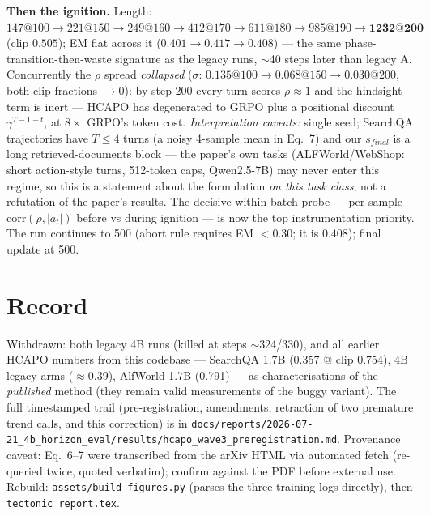 \documentclass[11pt]{article}
\begin{document}
\textbf{Then the ignition.} Length: $147@100 \to 221@150 \to 249@160 \to 412@170 \to 611@180
\to 985@190 \to \mathbf{1232@200}$ (clip $0.505$); EM flat across it ($0.401\to0.417\to0.408$) ---
the same phase-transition-then-waste signature as the legacy runs, $\sim$40 steps later than legacy
A. Concurrently the $\rho$ spread \emph{collapsed} ($\sigma$: $0.135@100 \to 0.068@150 \to
0.030@200$, both clip fractions $\to0$): by step 200 every turn scores $\rho\approx1$ and the
hindsight term is inert --- HCAPO has degenerated to GRPO plus a positional discount
$\gamma^{T-1-t}$, at $8\times$ GRPO's token cost. \emph{Interpretation caveats:} single seed;
SearchQA trajectories have $T\le4$ turns (a noisy 4-sample mean in Eq.~7) and our $s_{final}$ is a
long retrieved-documents block --- the paper's own tasks (ALFWorld/WebShop: short action-style
turns, 512-token caps, Qwen2.5-7B) may never enter this regime, so this is a statement about the
formulation \emph{on this task class}, not a refutation of the paper's results. The decisive
within-batch probe --- per-sample $\mathrm{corr}(\rho, |a_t|)$ before vs during ignition --- is now
the top instrumentation priority. The run continues to 500 (abort rule requires EM $<0.30$; it is
$0.408$); final update at 500.

\section{Record}
Withdrawn: both legacy 4B runs (killed at steps $\sim$324/330), and all earlier HCAPO numbers from
this codebase --- SearchQA 1.7B (0.357 @ clip 0.754), 4B legacy arms ($\approx$0.39), AlfWorld 1.7B
(0.791) --- as characterisations of the \emph{published} method (they remain valid measurements of
the buggy variant). The full timestamped trail (pre-registration, amendments, retraction of two
premature trend calls, and this correction) is in
\texttt{docs/reports/2026-07-21\_4b\_horizon\_eval/results/hcapo\_wave3\_preregistration.md}.
Provenance caveat: Eq.~6--7 were transcribed from the arXiv HTML via automated fetch (re-queried
twice, quoted verbatim); confirm against the PDF before external use. Rebuild:
\texttt{assets/build\_figures.py} (parses the three training logs directly), then
\texttt{tectonic report.tex}.
\end{document}
